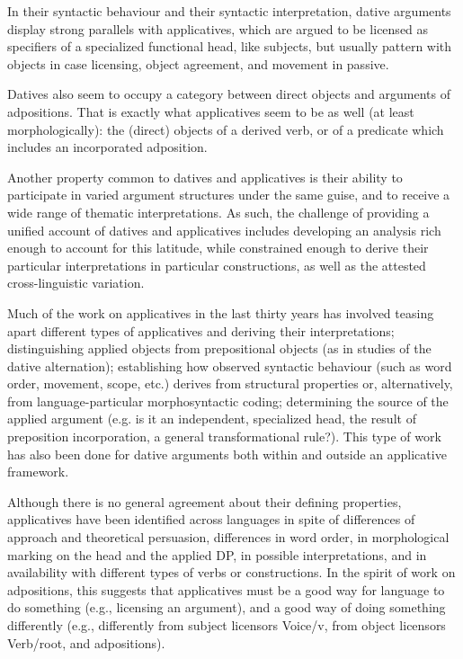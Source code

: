 \documentclass[output=paper,colorlinks,citecolor=brown,modfonts,nonflat]{langsci/langscibook}
\begin{document}
In their syntactic behaviour and their syntactic interpretation, dative arguments display strong parallels with applicatives, which are argued to be licensed as specifiers of a specialized functional head, like subjects, but usually pattern with objects in case licensing, object agreement, and movement in passive.

Datives also seem to occupy a category between direct objects and arguments of adpositions. That is exactly what applicatives seem to be as well (at least morphologically): the (direct) objects of a derived verb, or of a predicate which includes an incorporated adposition.

Another property common to datives and applicatives is their ability to participate in varied argument structures under the same guise, and to receive a wide range of thematic interpretations. As such, the challenge of providing a unified account of datives and applicatives includes developing an analysis rich enough to account for this latitude, while constrained enough to derive their particular interpretations in particular constructions, as well as the attested cross-linguistic variation.

Much of the work on applicatives in the last thirty years has involved teasing apart different types of applicatives and deriving their interpretations; distinguishing applied objects from prepositional objects (as in studies of the dative alternation); establishing how observed syntactic behaviour (such as word order, movement, scope, etc.) derives from structural properties or, alternatively, from language-particular morphosyntactic coding; determining the source of the applied argument (e.g. is it an independent, specialized head, the result of preposition incorporation, a general transformational rule?). This type of work has also been done for dative arguments both within and outside an applicative framework.

Although there is no general agreement about their defining properties, applicatives have been identified across languages in spite of differences of approach and theoretical persuasion, differences in word order, in morphological marking on the head and the applied DP, in possible interpretations, and in availability with different types of verbs or constructions. In the spirit of  work on adpositions, this suggests that applicatives must be a good way for language to do something (e.g., licensing an argument), and a good way of doing something differently (e.g., differently from subject licensors Voice/v, from object licensors Verb/root, and adpositions).
\end{document}

